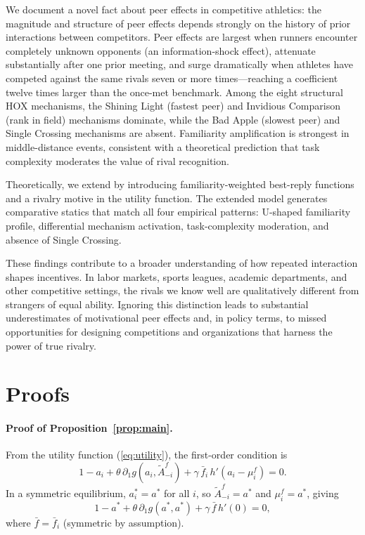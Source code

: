 \documentclass[12pt]{article}
\theoremstyle{definition}
\theoremstyle{remark}
\begin{document}
We document a novel fact about peer effects in competitive athletics: the
magnitude and structure of peer effects depends strongly on the history of prior
interactions between competitors.
Peer effects are largest when runners encounter completely unknown opponents
(an information-shock effect), attenuate substantially after one prior meeting,
and surge dramatically when athletes have competed against the same rivals
seven or more times---reaching a coefficient twelve times larger than the
once-met benchmark.
Among the eight structural HOX mechanisms, the Shining Light (fastest peer)
and Invidious Comparison (rank in field) mechanisms dominate, while the Bad Apple
(slowest peer) and Single Crossing mechanisms are absent.
Familiarity amplification is strongest in middle-distance events, consistent with
a theoretical prediction that task complexity moderates the value of rival recognition.

Theoretically, we extend \citet{Boucher2024} by introducing familiarity-weighted
best-reply functions and a rivalry motive in the utility function.
The extended model generates comparative statics that match all four empirical
patterns: U-shaped familiarity profile, differential mechanism activation,
task-complexity moderation, and absence of Single Crossing.

These findings contribute to a broader understanding of how repeated interaction
shapes incentives.
In labor markets, sports leagues, academic departments, and other competitive
settings, the rivals we know well are qualitatively different from strangers
of equal ability.
Ignoring this distinction leads to substantial underestimates of motivational
peer effects and, in policy terms, to missed opportunities for designing
competitions and organizations that harness the power of true rivalry.

\clearpage
\appendix
\section{Proofs}
\label{app:proofs}

\paragraph{Proof of Proposition~\ref{prop:main}.}

From the utility function (\ref{eq:utility}), the first-order condition is
\[
1 - a_i + \theta\,\partial_1 g(a_i, \tilde{A}_{-i}^f) + \gamma\,\bar{f}_i\,h'(a_i - \mu_i^f) = 0.
\]
In a symmetric equilibrium, $a_i^* = a^*$ for all $i$, so $\tilde{A}_{-i}^f = a^*$
and $\mu_i^f = a^*$, giving
\[
1 - a^* + \theta\,\partial_1 g(a^*, a^*) + \gamma\,\bar{f}\,h'(0) = 0,
\]
where $\bar{f} = \bar{f}_i$ (symmetric by assumption).
\end{document}
